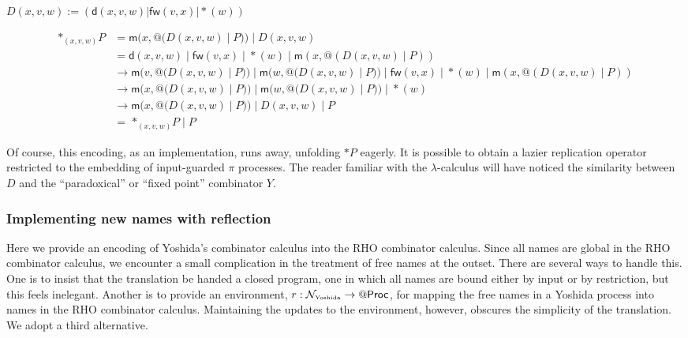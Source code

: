 \documentclass{llncs}
\makeatletter
\newcommand{\quotep}[1]{\mathsf{@}#1}
\newcommand{\QProc}{\quotep{\mathsf{Proc}}}
\newcommand{\red}{\rightarrow}
\makeatother
\begin{document}
\begin{definition}[Replication]
  \label{replication}
  $D(x,v,w) := (\mathsf{d}(x,v,w) | \mathsf{fw}(v,x) | {*}(w))$
\end{definition}
\[\begin{array}{rl}
  \mathsf{*}_{(x,v,w)} P &= \mathsf{m}(x,\quotep{(D(x,v,w) \; |\; P)}) \; |\; D(x,v,w) \\
        &= \mathsf{d}(x,v,w) \; |\; \mathsf{fw}(v,x) \; |\; {*}(w) \; |\; \mathsf{m}(x,\quotep{(D(x,v,w) \; |\; P)}) \\
        &\red \mathsf{m}(v,\quotep{(D(x,v,w) \; |\; P)}) \; |\; \mathsf{m}(w,\quotep{(D(x,v,w) \; |\; P)}) \; |\; \mathsf{fw}(v,x) \; |\; {*}(w) \; |\; \mathsf{m}(x,\quotep{(D(x,v,w) \; |\; P)}) \\
        &\red \mathsf{m}(x,\quotep{(D(x,v,w) \; |\; P)}) \; |\; \mathsf{m}(w,\quotep{(D(x,v,w) \; |\; P)}) \; |\; {*}(w) \\
        &\red \mathsf{m}(x,\quotep{(D(x,v,w) \; |\; P)}) \; |\; D(x,v,w) \; |\; P \\
        & = \; \mathsf{*}_{(x,v,w)} P \; |\; P
\end{array}\]

Of course, this encoding, as an implementation, runs away, unfolding
$\mathsf{*}P$ eagerly. It is possible to obtain a lazier
replication operator restricted to the embedding of
input-guarded $\pi$ processes. The reader familiar with the
$\lambda$-calculus will have noticed the similarity between $D$ and
the ``paradoxical'' or ``fixed point'' combinator $Y$.

\subsubsection{Implementing new names with reflection}

Here we provide an encoding of Yoshida's combinator calculus into the
RHO combinator calculus. Since all names are global in the RHO
combinator calculus, we encounter a small complication in the
treatment of free names at the outset. There are several ways to
handle this.  One is to insist that the translation be handed a closed
program, one in which all names are bound either by input or by
restriction, but this feels inelegant. Another is to provide
an environment, $r : \mathcal{N}_{\mbox{\tiny Yoshida}} \rightarrow \QProc$, for
mapping the free names in a Yoshida process into names in the RHO
combinator calculus. Maintaining the updates to the environment,
however, obscures the simplicity of the translation. We adopt a third
alternative.
\end{document}
